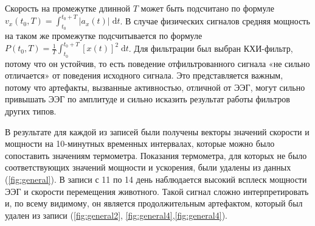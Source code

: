 \documentclass[12pt,a4paper,oneside]{article}
\begin{document}
Скорость на промежутке длинной $T$ может быть подсчитано по формуле $v_{x}(t_0, T) = \int_{t_0}^{t_0 + T} | a_{x}(t)| \; \text{d}t$. В случае физических сигналов средняя мощность на таком же промежутке подсчитывается по формуле $P(t_0, T) = \frac{1}{T} \int_{t_0}^{t_0 + T} [x(t)]^2 \; \text{d}t$. Для фильтрации был выбран КХИ-фильтр, потому что он устойчив, то есть поведение отфильтрованного сигнала «не сильно отличается» от поведения исходного сигнала. Это представляется важным, потому что артефакты, вызванные активностью, отличной от ЭЭГ, могут сильно привышать ЭЭГ по амплитуде и сильно исказить результат работы фильтров других типов.

В результате для каждой из записей были получены векторы значений скорости и мощности на 10-минутных временных интервалах, которые можно было сопоставить значениям термометра. Показания термометра, для которых не было соответствующих значений мощности и ускорения, были удалены из данных (\ref{fig:general}). В записи с 11 по 14 день наблюдается высокий всплеск мощности ЭЭГ и скорости перемещения животного. Такой сигнал сложно интерпретировать и, по всему видимому, он является продолжительным артефактом, который был удален из записи (\ref{fig:general2}, \ref{fig:general4},\ref{fig:general4}). 
\end{document}
